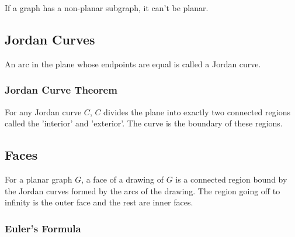 If a graph has a non-planar subgraph, it can't be planar.

\subsection{Jordan Curves}

An arc in the plane whose endpoints are equal is called a Jordan curve.

\subsubsection{Jordan Curve Theorem}

For any Jordan curve $C$, $C$ divides the plane into exactly two connected regions
called the 'interior' and 'exterior'. The curve is the boundary of these regions. 

\subsection{Faces}

For a planar graph $G$, a face of a drawing of $G$ is a connected region
bound by the Jordan curves formed by the arcs of the drawing. 
The region going off to infinity is the outer face and the rest are inner faces.

\subsubsection{Euler's Formula}

